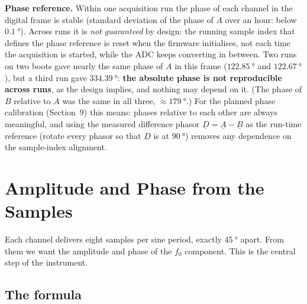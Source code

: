 \documentclass[11pt,a4paper]{article}
\begin{document}
\textbf{Phase reference.}  Within one acquisition run the phase of each
channel in the digital frame is stable (standard deviation of the phase of
$A$ over an hour: below $\SI{0.1}{\degree}$).  Across runs it is \emph{not
guaranteed} by design: the running sample index that defines the phase
reference is reset when the firmware initialises, not each time the
acquisition is started, while the ADC keeps converting in between.  Two
runs on two boots gave nearly the same phase of $A$ in this frame
($\SI{122.85}{\degree}$ and $\SI{122.67}{\degree}$), but a third run gave
$\SI{334.39}{\degree}$: \textbf{the absolute phase is not reproducible across
runs}, as the design implies, and nothing may depend on it.  (The phase of
$B$ relative to $A$ was the same in all three, $\approx\SI{179}{\degree}$.)
For the planned phase calibration
(Section~9) this means: phases relative to each other are always
meaningful, and using the measured difference phasor $\underline{D}=\underline{A}-\underline{B}$
as the run-time reference (rotate every phasor so that $\underline{D}$ is at
$\SI{90}{\degree}$) removes any dependence on the sample-index alignment.

\section{Amplitude and Phase from the Samples}

Each channel delivers eight samples per sine period, exactly
$\SI{45}{\degree}$ apart.  From them we want the amplitude and phase of the
$f_0$ component.  This is the central step of the instrument.

\subsection{The formula}
\end{document}
